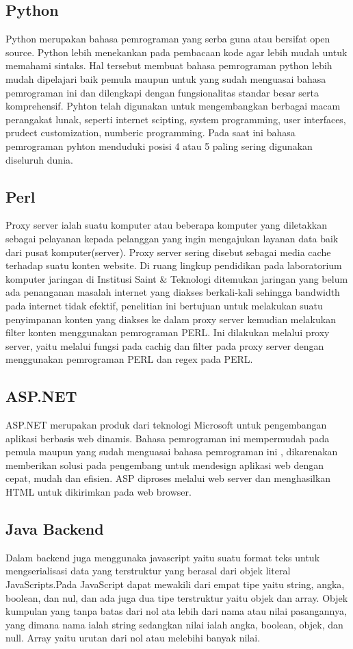 \subsection{Python}
Python merupakan  bahasa pemrograman yang serba guna atau bersifat open source. Python lebih menekankan pada pembacaan  kode agar lebih mudah untuk memahami sintaks. Hal tersebut membuat bahasa pemrograman python lebih mudah dipelajari baik pemula maupun untuk yang sudah menguasai bahasa pemrograman ini dan dilengkapi dengan fungsionalitas standar besar serta komprehensif. Pyhton telah digunakan untuk mengembangkan berbagai macam perangakat lunak, seperti internet scipting, system programming, user interfaces, prudect customization, numberic programming. Pada saat ini bahasa pemrograman pyhton menduduki posisi 4 atau 5 paling sering digunakan diseluruh dunia.

\subsection{Perl}
Proxy server ialah suatu komputer atau beberapa komputer yang diletakkan sebagai pelayanan kepada pelanggan yang ingin mengajukan layanan data baik dari pusat komputer(server).
Proxy server sering disebut sebagai media cache terhadap suatu konten website. Di ruang lingkup pendidikan pada laboratorium komputer jaringan di Institusi Saint & Teknologi ditemukan jaringan yang belum ada penanganan masalah internet yang diakses berkali-kali sehingga bandwidth pada internet tidak efektif, penelitian ini bertujuan  untuk melakukan suatu penyimpanan konten yang diakses ke dalam proxy server kemudian melakukan filter konten menggunakan pemrograman PERL.
Ini dilakukan melalui proxy server, yaitu melalui fungsi pada cachig dan filter pada proxy server dengan menggunakan pemrograman PERL dan regex pada PERL.

\subsection{ASP.NET}
ASP.NET merupakan produk dari teknologi Microsoft untuk pengembangan aplikasi berbasis web dinamis. 
Bahasa pemrograman ini mempermudah pada pemula maupun yang sudah menguasai bahasa pemrograman ini , dikarenakan memberikan solusi pada pengembang untuk mendesign aplikasi web dengan cepat, mudah dan efisien. 
ASP diproses melalui web server dan menghasilkan HTML untuk dikirimkan pada web browser.



\subsection{Java Backend}
Dalam backend juga menggunaka javascript yaitu suatu format teks untuk mengserialisasi data yang terstruktur yang berasal dari objek literal JavaScripts.Pada JavaScript dapat mewakili dari empat tipe yaitu string, angka, boolean, dan nul, dan ada juga dua tipe terstruktur yaitu objek dan array. Objek kumpulan yang tanpa batas dari nol ata lebih dari nama atau nilai pasangannya, yang dimana nama ialah string sedangkan nilai ialah angka, boolean, objek, dan null. Array yaitu urutan dari nol atau melebihi banyak nilai.

